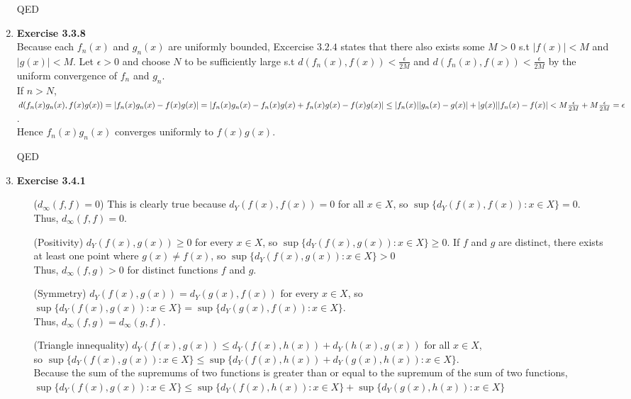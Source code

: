 \documentclass[10pt]{article}
\begin{document}
\begin{enumerate}[label=Problem \arabic*.]
    QED
    \item \textbf{Exercise 3.3.8}\\
    Because each $f_n(x)$ and $g_n(x)$ are uniformly bounded, Excercise $3.2.4$ states that there also exists some $M>0$ s.t $|f(x)|<M$ and $|g(x)|<M$.
    Let $\epsilon>0$ and choose $N$ to be sufficiently large s.t $d(f_n(x),f(x))<\frac{\epsilon}{2M}$ and $d(f_n(x),f(x))<\frac{\epsilon}{2M}$ by the uniform convergence of $f_n$ and $g_n$.\\
    If $n>N$, $d(f_n(x)g_n(x),f(x)g(x))=|f_n(x)g_n(x)-f(x)g(x)|\\=|f_n(x)g_n(x)-f_n(x)g(x)+f_n(x)g(x)-f(x)g(x)|\\\le |f_n(x)||g_n(x)-g(x)|+|g(x)||f_n(x)-f(x)|< M\frac{\epsilon}{2M}+M\frac{\epsilon}{2M}=\epsilon$.\\
    Hence $f_n(x)g_n(x)$ converges uniformly to $f(x)g(x)$.\par 
    QED 
    \item \textbf{Exercise 3.4.1}\\
    \begin{itemize}
        \item [($d_\infty(f,f)=0$)] This is clearly true because $d_Y(f(x),f(x))=0$ for all $x\in X$, so $\sup\{d_Y(f(x),f(x)):x\in X\}=0$.\\ Thus, $d_\infty(f,f)=0$. 
        \item [(Positivity)] $d_Y(f(x),g(x))\ge0$ for every $x\in X$, so $\sup\{d_Y(f(x),g(x)):x\in X\}\ge0$. If $f$ and $g$ are distinct, there exists at least one point where $g(x)\neq f(x)$, so $\sup\{d_Y(f(x),g(x)):x\in X\}>0$\\ Thus, $d_\infty(f,g)>0$ for distinct functions $f$ and $g$.
        \item [(Symmetry)] $d_Y(f(x),g(x))=d_Y(g(x),f(x))$ for every $x\in X$, so\\ $\sup\{d_Y(f(x),g(x)):x\in X\}=\sup\{d_Y(g(x),f(x)):x\in X\}$. \\Thus, $d_\infty(f,g)=d_\infty(g,f)$.
        \item [(Triangle innequality)] $d_Y(f(x),g(x))\le d_Y(f(x),h(x))+d_Y(h(x),g(x))$ for all $x\in X$,\\ 
        so $\sup\{d_Y(f(x),g(x)):x\in X\}\le\sup\{d_Y(f(x),h(x))+d_Y(g(x),h(x)):x\in X\}$.\\
        Because the sum of the supremums of two functions is greater than or equal to the supremum of the sum of two functions,\\
        $\sup\{d_Y(f(x),g(x)):x\in X\}\le\sup\{d_Y(f(x),h(x)):x\in X\}+\sup\{d_Y(g(x),h(x)):x\in X\}$\\

\end{itemize}
\end{enumerate}
\end{document}
